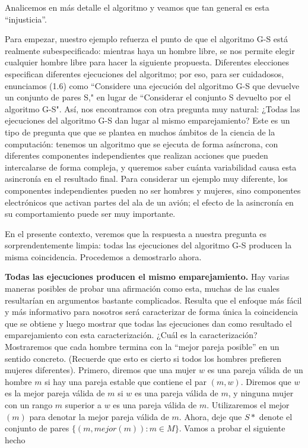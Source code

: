 \documentclass[a4paper, 12pt]{book}
\theoremstyle{dotless}
\begin{document}
Analicemos en más detalle el algoritmo y veamos que tan general es esta ``injusticia''.

Para empezar, nuestro ejemplo refuerza el punto de que el algoritmo G-S está realmente subespecificado: mientras haya un hombre libre, se nos permite elegir cualquier hombre libre para hacer la siguiente propuesta. Diferentes elecciones especifican diferentes ejecuciones del algoritmo; por eso, para ser cuidadosos, enunciamos (1.6) como ``Considere una ejecución del algoritmo G-S que devuelve un conjunto de pares S," en lugar de ``Considerar el conjunto S devuelto por el algoritmo G-S". Así, nos encontramos con otra pregunta muy natural: ¿Todas las ejecuciones del algoritmo G-S dan lugar al mismo emparejamiento? Este es un tipo de pregunta que que se plantea en muchos ámbitos de la ciencia de la computación: tenemos un algoritmo que se ejecuta de forma asíncrona, con diferentes componentes independientes que realizan acciones que pueden intercalarse de forma compleja, y queremos saber cuánta variabilidad causa esta asincronía en el resultado final. Para considerar un ejemplo muy diferente, los componentes independientes pueden no ser hombres y mujeres, sino componentes electrónicos que activan partes del ala de un avión; el efecto de la asincronía en su comportamiento puede ser muy importante.

En el presente contexto, veremos que la respuesta a nuestra pregunta es sorprendentemente limpia: todas las ejecuciones del algoritmo G-S producen la misma coincidencia. Procedemos a demostrarlo ahora.

\textbf{Todas las ejecuciones producen el mismo emparejamiento.}
Hay varias maneras posibles de probar una afirmación como esta, muchas de las cuales resultarían en argumentos bastante complicados. Resulta que el enfoque más fácil y más informativo para nosotros será caracterizar de forma única la coincidencia que se obtiene y luego mostrar que todas las ejecuciones dan como resultado el emparejamiento con esta caracterización.
¿Cuál es la caracterización? Mostraremos que cada hombre termina con la ``mejor pareja posible'' en un sentido concreto. (Recuerde que esto es cierto si todos los hombres prefieren mujeres diferentes). Primero, diremos que una mujer $w$ es una pareja válida de un hombre $m$ si hay una pareja estable que contiene el par $(m, w)$. Diremos que $w$ es la mejor pareja válida de $m$ si $w$ es una pareja válida de $m$, y ninguna mujer con un rango $m$ superior a $w$ es una pareja válida de $m$. Utilizaremos el mejor $(m)$ para denotar la mejor pareja válida de $m$. Ahora, deje que $S*$ denote el conjunto de pares $\{(m, mejor (m)): m  \in  M\}$. Vamos a probar el siguiente hecho
\end{document}
